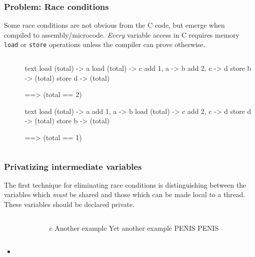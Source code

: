 \documentclass[handout]{beamer}
\begin{document}
\begin{frame}[fragile]
  \frametitle{Problem: Race conditions}
  Some race conditions are not obvious from the C code, but emerge when compiled to assembly/microcode. \emph{Every} variable access in C requires memory \texttt{load} or \texttt{store} operations unless the compiler can prove otherwise. 
  
  \begin{columns}[t]%
    \begin{column}{0.43\textwidth}
    \end{column}

    \begin{column}{0.43\textwidth}
    \end{column}
    
    \begin{column}{0.3\textwidth}
      \begin{ccode}[after skip=4pt]
        {text}
        load (total) -> a
          load (total) -> c
        add 1, a -> b
          add 2, c -> d
        store b -> (total)
          store d -> (total)

          ==> (total == 2)\end{ccode}
      \begin{ccode}[]
        {text}
        load (total) -> a
        add 1, a -> b
          load (total) -> c
          add 2, c -> d
          store d -> (total)
        store b -> (total)
        
          ==> (total == 1)\end{ccode}
    \end{column}
  \end{columns}
\end{frame}



\begin{frame}[fragile]
  \frametitle{Privatizing intermediate variables}
  The first technique for eliminating race conditions is distinguishing between the variables which \emph{must} be shared and those which can be made local to a thread. These variables should be declared private.
  \begin{columns}[t]%
    \begin{column}{0.4\textwidth}
    \end{column}
    \pause
    \begin{column}{0.4\textwidth}
      \begin{ccode}[]
        {c}
        Another example
        Yet another example
        PENIS
        PENIS
      \end{ccode}
    \end{column}
  \end{columns}
  \pause
  \begin{itemize}
  \item 
  \end{itemize}
\end{frame}
\end{document}
